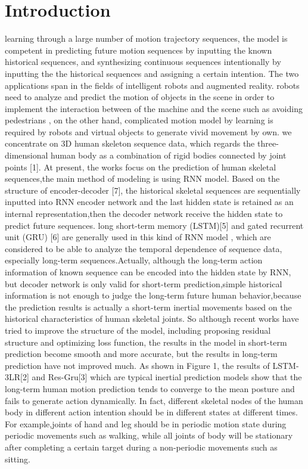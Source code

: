 \documentclass[conference]{IEEEtran}
\begin{document}
\section{Introduction}
learning through a large number of motion trajectory sequences, the model is competent in predicting future motion sequences by inputting the known historical sequences, and synthesizing continuous sequences intentionally by inputting the the historical sequences and assigning a certain intention. The two applications span in the fields of intelligent robots and augmented reality. robots need to analyze and predict the motion of objects in the scene in order to implement the interaction between of the machine and the scene such as avoiding pedestrians , on the other hand, complicated motion model by learning is required by robots and virtual objects to generate vivid movement by own.  
we concentrate on 3D human skeleton sequence data, which regards the three-dimensional human body as a combination of rigid bodies connected by joint points [1]. At present, the works focus on the prediction of human skeletal sequences,the main method of modeling is using RNN model. Based on the structure of encoder-decoder [7], the historical skeletal sequences are sequentially inputted into RNN encoder network and the last hidden state is retained as an internal representation,then the decoder network receive the hidden state to predict future sequences. long short-term memory (LSTM)[5] and gated recurrent unit (GRU) [6] are generally used in this kind of RNN model , which are considered to be able to analyze the temporal dependence of sequence data, especially long-term sequences.Actually, although the long-term action information of known sequence can be encoded into the hidden state by RNN, but decoder network is only valid for short-term prediction,simple historical information is not enough to judge the long-term future human behavior,because the prediction results is actually a short-term inertial movements based on the historical characteristics of human skeletal joints. So although recent works have tried to improve the structure of the model, including proposing residual structure and optimizing loss function, the results in the model in short-term prediction become smooth and more accurate, but the results in long-term prediction have not improved much.
As shown in Figure 1, the results of LSTM-3LR[2] and Res-Gru[3] which are typical inertial prediction models show that the long-term human motion prediction tends to converge to the mean posture and fails to generate action dynamically. In fact, different skeletal nodes of the human body in different action intention should be in different states at different times. For example,joints of hand and leg should be in periodic motion state during periodic movements such as walking, while all joints of body will be stationary after completing a certain target during a non-periodic movements such as sitting.
\end{document}
